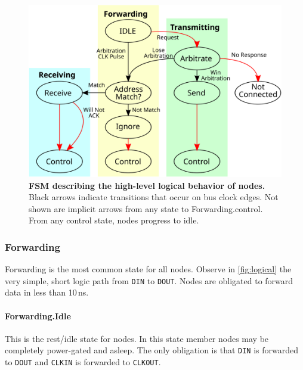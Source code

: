 \begin{figure}
\begin{minipage}[b]{.48\linewidth}
    \label{fig:logical}
  \end{minipage}
\end{figure}

\begin{figure}[h]
  \includegraphics[width=\linewidth]{img/fsm_diagram}
  \caption{\textbf{FSM describing the high-level logical behavior of \bus
    nodes.} \textmd{
    Black arrows indicate transitions that occur on bus clock edges. Not shown
    are implicit arrows from any state to Forwarding.{\sc control}. From any
    {\sc control} state, nodes progress to {\sc idle}.
    }}
\end{figure}

\subsubsection{Forwarding}
Forwarding is the most common state for all \bus nodes. Observe in
\autoref{fig:logical} the very simple, short logic path from {\tt DIN} to
{\tt DOUT}. Nodes are obligated to forward data in less than 10\,ns.

\paragraph{Forwarding.{\sc Idle}}
This is the rest/idle state for \bus nodes. In this state member nodes may be
completely power-gated and asleep. The only obligation is that {\tt DIN} is
forwarded to {\tt DOUT} and {\tt CLKIN} is forwarded to {\tt CLKOUT}.

